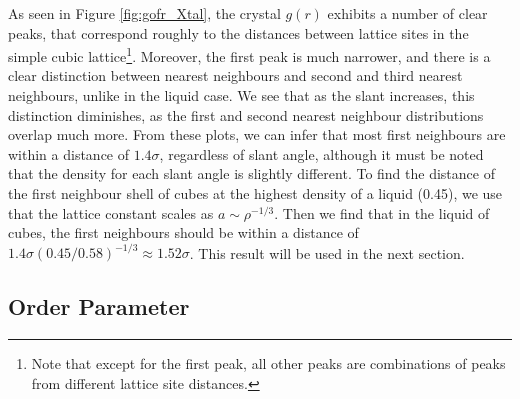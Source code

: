 \documentclass[thesis]{subfiles}
\begin{document}
As seen in Figure \ref{fig:gofr_Xtal}, the crystal $g(r)$ exhibits a number of clear peaks, that correspond roughly to the distances between lattice sites in the simple cubic lattice\footnote{Note that except for the first peak, all other peaks are combinations of peaks from different lattice site distances.}. Moreover, the first peak is much narrower, and there is a clear distinction between nearest neighbours and second and third nearest neighbours, unlike in the liquid case. We see that as the slant increases, this distinction diminishes, as the first and second nearest neighbour distributions overlap much more. From these plots, we can infer that most first neighbours are within a distance of $1.4\sigma$, regardless of slant angle, although it must be noted that the density for each slant angle is slightly different. To find the distance of the first neighbour shell of cubes at the highest density of a liquid (0.45)\cite{van2017phase}, we use that the lattice constant scales as $a \sim \rho^{-1/3}$. Then we find that in the liquid of cubes, the first neighbours should be within a distance of $1.4\sigma (0.45/0.58)^{-1/3} \approx 1.52\sigma$. This result will be used in the next section.




\subsection{Order Parameter} \label{subsec:order}
\end{document}
